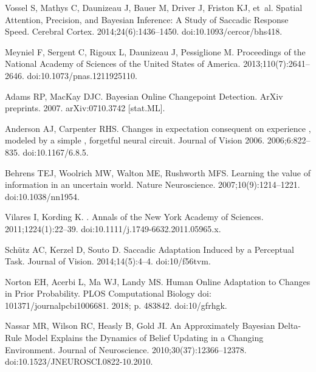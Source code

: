 \documentclass[10pt,letterpaper]{article}
\begin{document}
\begin{thebibliography}{10}
Vossel S, Mathys C, Daunizeau J, Bauer M, Driver J, Friston KJ, et~al.
\newblock Spatial {Attention}, {Precision}, and {Bayesian} {Inference}: {A}
  {Study} of {Saccadic} {Response} {Speed}.
\newblock Cerebral Cortex. 2014;24(6):1436--1450.
\newblock doi:{10.1093/cercor/bhs418}.

Meyniel F, Sergent C, Rigoux L, Daunizeau J, Pessiglione M.
\newblock Proceedings of the National Academy of Sciences of the United States
  of America. 2013;110(7):2641--2646.
\newblock doi:{10.1073/pnas.1211925110}.

Adams RP, MacKay DJC.
\newblock Bayesian Online Changepoint Detection.
\newblock ArXiv preprints. 2007.
\newblock arXiv:{0710.3742} [stat.ML].

Anderson AJ, Carpenter RHS.
\newblock Changes in expectation consequent on experience , modeled by a simple
  , forgetful neural circuit.
\newblock Journal of Vision 2006. 2006;6:822--835.
\newblock doi:{10.1167/6.8.5}.

Behrens TEJ, Woolrich MW, Walton ME, Rushworth MFS.
\newblock Learning the value of information in an uncertain world.
\newblock Nature Neuroscience. 2007;10(9):1214--1221.
\newblock doi:{10.1038/nn1954}.

Vilares I, Kording K.
.
\newblock Annals of the New York Academy of Sciences. 2011;1224(1):22--39.
\newblock doi:{10.1111/j.1749-6632.2011.05965.x}.

Sch{\"u}tz AC, Kerzel D, Souto D.
\newblock Saccadic Adaptation Induced by a Perceptual Task.
\newblock Journal of Vision. 2014;14(5):4--4.
\newblock doi:{10/f56tvm}.

Norton EH, Acerbi L, Ma WJ, Landy MS.
\newblock Human Online Adaptation to Changes in Prior Probability.
\newblock PLOS Computational Biology doi: 101371/journalpcbi1006681. 2018; p.
  483842.
\newblock doi:{10/gfrhgk}.

Nassar MR, Wilson RC, Heasly B, Gold JI.
\newblock An {{Approximately Bayesian Delta}}-{{Rule Model Explains}} the
  {{Dynamics}} of {{Belief Updating}} in a {{Changing Environment}}.
\newblock Journal of Neuroscience. 2010;30(37):12366--12378.
\newblock doi:{10.1523/JNEUROSCI.0822-10.2010}.


\end{thebibliography}
\end{document}
